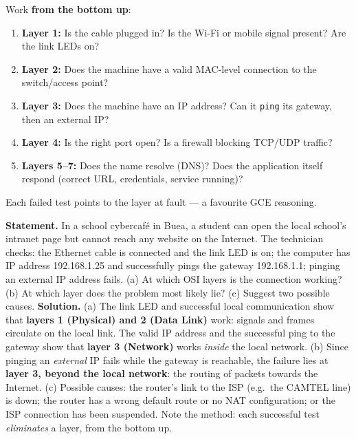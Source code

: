 \documentclass[11pt]{article}
\begin{document}
\begin{methode}
Work \textbf{from the bottom up}:
\begin{enumerate}
\item \textbf{Layer 1:} Is the cable plugged in? Is the Wi-Fi or mobile signal present? Are the link LEDs on?
\item \textbf{Layer 2:} Does the machine have a valid MAC-level connection to the switch/access point?
\item \textbf{Layer 3:} Does the machine have an IP address? Can it \texttt{ping} its gateway, then an external IP?
\item \textbf{Layer 4:} Is the right port open? Is a firewall blocking TCP/UDP traffic?
\item \textbf{Layers 5--7:} Does the name resolve (DNS)? Does the application itself respond (correct URL, credentials, service running)?
\end{enumerate}
Each failed test points to the layer at fault — a favourite GCE reasoning.
\end{methode}

\begin{exoresolu}
\textbf{Statement.} In a school cybercafé in Buea, a student can open the local school's intranet page but cannot reach any website on the Internet. The technician checks: the Ethernet cable is connected and the link LED is on; the computer has IP address 192.168.1.25 and successfully pings the gateway 192.168.1.1; pinging an external IP address fails. (a) At which OSI layers is the connection working? (b) At which layer does the problem most likely lie? (c) Suggest two possible causes. \tcblower
\textbf{Solution.} (a) The link LED and successful local communication show that \textbf{layers 1 (Physical) and 2 (Data Link)} work: signals and frames circulate on the local link. The valid IP address and the successful ping to the gateway show that \textbf{layer 3 (Network)} works \emph{inside} the local network. (b) Since pinging an \emph{external} IP fails while the gateway is reachable, the failure lies at \textbf{layer 3, beyond the local network}: the routing of packets towards the Internet. (c) Possible causes: the router's link to the ISP (e.g.\ the CAMTEL line) is down; the router has a wrong default route or no NAT configuration; or the ISP connection has been suspended. Note the method: each successful test \emph{eliminates} a layer, from the bottom up.
\end{exoresolu}
\end{document}
